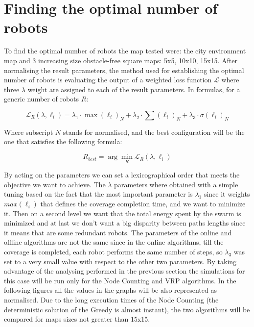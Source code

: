
\section{Finding the optimal number of robots}
To find the optimal number of robots the map tested were: the city environment map and 3 increasing size obstacle-free square maps: 5x5, 10x10, 15x15. After normalising the result parameters, the method used for establishing the optimal number of robots is evaluating the output of a weighted loss function $\mathscr{L}$ where three $\lambda$ weight are assigned to each of the result parameters. In formulas, for a generic number of robots $R$:

\begin{equation}
\mathscr{L}_R(\lambda, \ell_i)=\lambda_1 \cdot \max(\ell_i)_N + \lambda_2 \cdot \sum(\ell_i)_N + \lambda_3 \cdot \sigma(\ell_i)_N
\end{equation}

Where subscript $N$ stands for normalised, and the best configuration will be the one that satisfies the following formula:

\begin{equation}
R_{best} = \arg\min_R \mathscr{L}_R(\lambda, \ell_i)
\end{equation}
 
By acting on the parameters we can set a  lexicographical order that meets the objective we want to achieve. The $\lambda$ parameters where obtained with a simple tuning based on the fact that the most important parameter is $\lambda_1$ since it weights $max(\ell_i)$ that defines the coverage completion time, and we want to minimize it. Then on a second level we want that the total energy spent by the swarm is minimized and at last we don't want a big disparity between paths lengths since it means that are some redundant robots. The parameters of the online and offline algorithms are not the same since in the online algorithms, till the coverage is completed, each robot performs the same number of steps, so $\lambda_3$ was set to a very small value with respect to the other two parameters.
By taking advantage of the analysing performed in the previous section the simulations for this case will be run only for the Node Counting and VRP algorithms.
In the following figures all the values in the graphs will be also represented as normalised. Due to the long execution times of the Node Counting (the deterministic solution of the Greedy is almost instant), the two algorithms will be compared for maps sizes not greater than 15x15.

